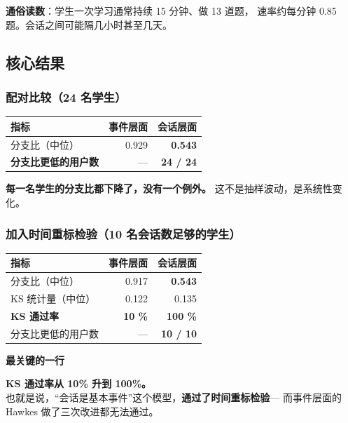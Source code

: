 \documentclass[UTF8,a4paper,11pt]{ctexart}
\newenvironment{explainbox}[1]
{\begin{center}\begin{minipage}{0.94\textwidth}\colorbox{boxbg}{\parbox{0.92\textwidth}{\textbf{#1}\par\vspace{2pt}}}}
{\end{minipage}\end{center}}
\newcommand{\hl}[1]{\textcolor{blue!70!black}{\textbf{#1}}}
\newcommand{\warn}[1]{\textcolor{red!70!black}{\textbf{#1}}}
\begin{document}
\textbf{通俗读数}：学生一次学习通常持续 15 分钟、做 13 道题，
速率约每分钟 0.85 题。会话之间可能隔几小时甚至几天。

\subsection{核心结果}

\subsubsection{配对比较（24 名学生）}

\begin{center}
\begin{tabular}{p{5.4cm}rr}
\toprule
\textbf{指标} & \textbf{事件层面} & \textbf{会话层面} \\
\midrule
分支比（中位） & 0.929 & \hl{0.543} \\
\textbf{分支比更低的用户数} & --- & \hl{\textbf{24 / 24}} \\
\bottomrule
\end{tabular}
\end{center}

\textbf{每一名学生的分支比都下降了，没有一个例外。}
这不是抽样波动，是系统性变化。

\subsubsection{加入时间重标检验（10 名会话数足够的学生）}

\begin{center}
\begin{tabular}{p{5.4cm}rr}
\toprule
\textbf{指标} & \textbf{事件层面} & \textbf{会话层面} \\
\midrule
分支比（中位） & 0.917 & \hl{0.543} \\
KS 统计量（中位） & 0.122 & 0.135 \\
\textbf{KS 通过率} & \warn{\textbf{10 \%}} & \hl{\textbf{100 \%}} \\
分支比更低的用户数 & --- & \hl{10 / 10} \\
\bottomrule
\end{tabular}
\end{center}

\begin{explainbox}{最关键的一行}
\textbf{KS 通过率从 10\% 升到 100\%。}\\[4pt]
也就是说，“会话是基本事件”这个模型，\hl{通过了时间重标检验}---
而事件层面的 Hawkes 做了三次改进都无法通过。
\end{explainbox}
\end{document}

